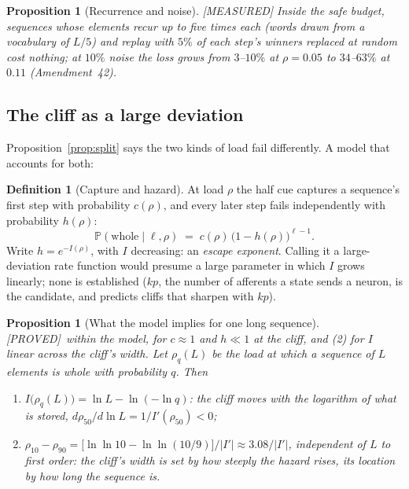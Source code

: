 \documentclass[11pt]{article}
\theoremstyle{definition}
\newtheorem{definition}{Definition}
\theoremstyle{plain}
\newtheorem{proposition}[lemma]{Proposition}
\newcommand{\PROVED}{\textnormal{\footnotesize\textsf{[PROVED]}}}
\newcommand{\MEASURED}{\textnormal{\footnotesize\textsf{[MEASURED]}}}
\newcommand{\Prob}{\mathbb{P}}
\begin{document}
\begin{proposition}[Recurrence and noise]\label{prop:reuse} \MEASURED
Inside the safe budget, sequences whose elements recur up to five times each
(words drawn from a vocabulary of $L/5$) and replay with $5\%$ of each step's
winners replaced at random cost nothing; at $10\%$ noise the loss grows from
$3$--$10\%$ at $\rho = 0.05$ to $34$--$63\%$ at $0.11$ (Amendment~42).
\end{proposition}

\subsection{The cliff as a large deviation}\label{sec:hazard}

Proposition~\ref{prop:split} says the two kinds of load fail differently.
A model that accounts for both:

\begin{definition}[Capture and hazard]
At load $\rho$ the half cue captures a sequence's first step with probability
$c(\rho)$, and every later step fails independently with probability $h(\rho)$:
\[
  \Prob(\text{whole} \mid \ell, \rho) \;=\; c(\rho)\,\bigl(1-h(\rho)\bigr)^{\ell-1}.
\]
Write $h = e^{-I(\rho)}$, with $I$ decreasing: an \emph{escape exponent}. Calling
it a large-deviation rate function would presume a large parameter in which $I$
grows linearly; none is established ($kp$, the number of afferents a state
sends a neuron, is the candidate, and predicts cliffs that sharpen with $kp$).
\end{definition}

\begin{proposition}[What the model implies for one long sequence]\label{prop:ld}
\PROVED\ within the model, for $c \approx 1$ and $h \ll 1$ at the cliff, and (2)
for $I$ linear across the cliff's width. Let
$\rho_q(L)$ be the load at which a sequence of $L$ elements is whole with
probability $q$. Then
\begin{enumerate}
\item $I\bigl(\rho_q(L)\bigr) = \ln L - \ln(-\ln q)$: the cliff moves with the
  \emph{logarithm} of what is stored, $d\rho_{50}/d\ln L = 1/I'(\rho_{50}) < 0$;
\item $\rho_{10} - \rho_{90} = \bigl[\ln\ln 10 - \ln\ln(10/9)\bigr]/|I'| \approx
  3.08/|I'|$, independent of $L$ to first order: the cliff's width is set by
  how steeply the hazard rises, its location by how long the sequence is.
\end{enumerate}
\end{proposition}
\end{document}
